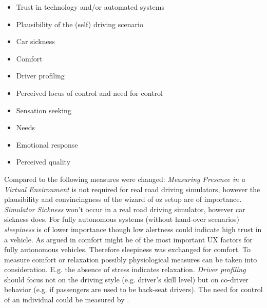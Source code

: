 \begin{itemize} %
  \item Trust in technology and/or automated systems
  \item Plausibility of the (self) driving scenario 
  \item Car sickness 
  \item Comfort
  \item Driver profiling
  \item Perceived locus of control and need for control
  \item Sensation seeking
  \item Needs
  \item Emotional response
  \item Perceived quality
\end{itemize}
Compared to \cite{Ive} the following measures were changed: \emph{Measuring Presence in a Virtual Environment} is not required for real road driving simulators, however the plausibility and convincingness of the wizard of oz setup are of importance. \emph{Simulator Sickness} won't occur in a real road driving simulator, however car sickness does. For fully autonomous systems (without hand-over scenarios) \emph{sleepiness} is of lower importance though low alertness could indicate high trust in a vehicle. As argued in  comfort might be of the most important UX factors for fully autonomous vehicles. Therefore sleepiness was exchanged for comfort. To measure comfort or relaxation possibly physiological measures can be taken into consideration. E.g. the absence of stress \cite{Salai2016} indicates relaxation. \emph{Driver profiling} should focus not on the driving style (e.g. driver’s skill level) but on co-driver behavior (e.g. if passengers are used to be back-seat drivers). The need for control of an individual could be measured by \cite{Burger1979TheControl}.

